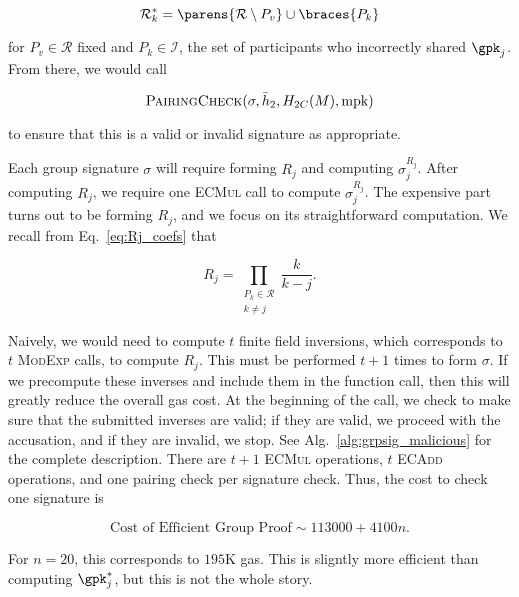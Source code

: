\begin{equation}
    \mathcal{R}^{*}_{k} = \parens{\mathcal{R}\setminus P_{v}}\cup
        \braces{P_{k}}
\end{equation}

\noindent
for $P_{v}\in\mathcal{R}$ fixed and $P_{k}\in\mathcal{I}$,
the set of participants who incorrectly shared $\gpk_{j}$.
From there, we would call

\begin{equation}
    \textsc{PairingCheck}(\sigma, \bar{h}_{2}, H_{2C}(M), \text{mpk})
\end{equation}

\noindent
to ensure that this is a valid or invalid signature as appropriate.

Each group signature $\sigma$ will require forming $R_{j}$
and computing $\sigma_{j}^{R_{j}}$.
After computing $R_{j}$, we require one \textsc{ECMul} call
to compute $\sigma_{j}^{R_{j}}$.
The expensive part turns out to be forming $R_{j}$,
and we focus on its straightforward computation.
We recall from Eq.~\eqref{eq:Rj_coefs} that

\begin{equation}
    R_{j} = \prod_{\substack{P_{k}\in\mathcal{R} \\ k\ne j}} \frac{k}{k-j}.
\end{equation}

\noindent
Naively, we would need to compute $t$ finite field inversions,
which corresponds to $t$ \textsc{ModExp} calls, to compute
$R_{j}$.
This must be performed $t+1$ times to form $\sigma$.
If we precompute these inverses and include them
in the function call, then this will greatly reduce the overall gas cost.
At the beginning of the call, we check to make sure that the submitted
inverses are valid; if they are valid, we proceed with the
accusation, and if they are invalid, we stop.
See Alg.~\ref{alg:grpsig_malicious} for the complete description.
There are $t+1$ \textsc{ECMul} operations, $t$ \textsc{ECAdd} operations,
and one pairing check per signature check.
Thus, the cost to check one signature is

\begin{equation}
    \text{Cost of Efficient Group Proof} \sim 113000 + 4100n.
    \label{eq:cost_group}
\end{equation}

\noindent
For $n=20$, this corresponds to $195$K gas.
This is sligntly more efficient than computing $\gpk_{j}^{*}$,
but this is not the whole story.

